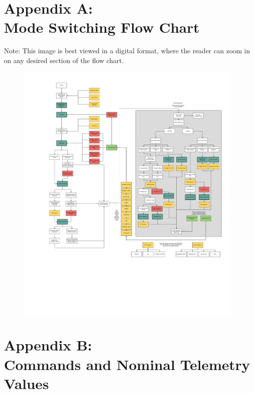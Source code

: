 \documentclass{article}
\begin{document}
\newpage

\section{Appendix A: \\ Mode Switching Flow Chart}

Note: This image is best viewed in a digital format, where the reader can zoom in on any desired section of the flow chart.

\begin{figure}[h!]
\centering
\includegraphics[width=\textwidth,height=.8\textheight]{FlowChart.pdf}
\end{figure} 

\newpage
\section{Appendix B: \\ Commands and Nominal Telemetry Values}
\end{document}
